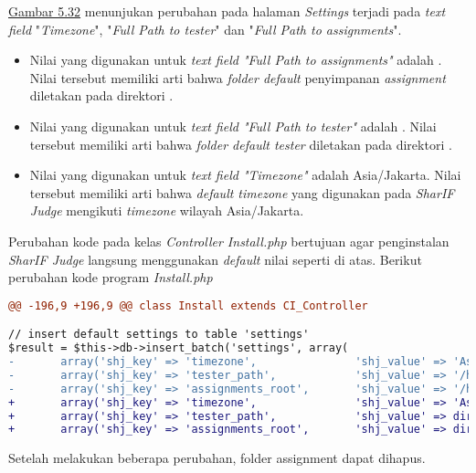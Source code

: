 	\hyperref[fig:set]{Gambar 5.32} menunjukan perubahan pada halaman \textit{Settings} terjadi pada \textit{text field} "\textit{Timezone}", "\textit{Full Path to tester}" dan "\textit{Full Path to assignments}". 
	\begin{itemize}
		\item Nilai yang digunakan untuk\textit{ text field "Full Path to assignments"} adalah . Nilai tersebut memiliki arti bahwa \textit{folder default} penyimpanan \textit{assignment} diletakan pada direktori .
		\item Nilai yang digunakan untuk \textit{text field "Full Path to tester"} adalah . Nilai tersebut memiliki arti bahwa \textit{folder default tester} diletakan pada direktori .
		\item Nilai yang digunakan untuk \textit{text field "Timezone"} adalah Asia/Jakarta. Nilai tersebut memiliki arti bahwa \textit{default timezone} yang digunakan pada \textit{SharIF Judge} mengikuti \textit{timezone} wilayah Asia/Jakarta.
	\end{itemize}
	
	Perubahan kode pada kelas \textit{Controller Install.php} bertujuan agar penginstalan \textit{SharIF Judge} langsung menggunakan \textit{default} nilai seperti di atas. Berikut perubahan kode program
	\textit{Install.php}
\begin{lstlisting}[language=diff, basicstyle=\ttfamily, frame=single,
columns=fullflexible, keepspaces=true, breaklines=true]
@@ -196,9 +196,9 @@ class Install extends CI_Controller

// insert default settings to table 'settings'
$result = $this->db->insert_batch('settings', array(
-   	array('shj_key' => 'timezone',               'shj_value' => 'Asia/Tehran'),
-       array('shj_key' => 'tester_path',            'shj_value' => '/home/shj/tester'),
-       array('shj_key' => 'assignments_root',       'shj_value' => '/home/shj/assignments'),
+       array('shj_key' => 'timezone',               'shj_value' => 'Asia/Jakarta'),
+       array('shj_key' => 'tester_path',            'shj_value' => dirname(__FILE__, 3) . "/restricted/tester"),
+       array('shj_key' => 'assignments_root',       'shj_value' => dirname(__FILE__, 3) . "/restricted/assignments"),
\end{lstlisting}
	Setelah melakukan beberapa perubahan, folder assignment dapat dihapus.
	
